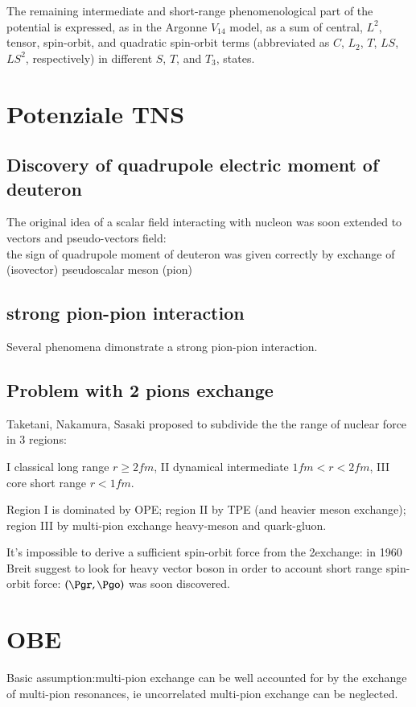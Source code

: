 \documentclass[main.tex]{subfiles}
\begin{document}
The remaining intermediate and short-range phenomenological part of the potential is expressed, as in the Argonne $V_{14}$ model, as a sum of central, $L^2$, tensor, spin-orbit, and quadratic spin-orbit terms (abbreviated as $C$, $L_2$, $T$, $LS$, $LS^2$, respectively) in different $S$, $T$, and $T_3$, states.

\section{Potenziale TNS}

\subsection{Discovery of quadrupole electric moment of deuteron}
The original idea of a scalar field interacting with nucleon was soon extended to vectors and pseudo-vectors field:\\
the sign of quadrupole moment of deuteron was given correctly by exchange of (isovector) pseudoscalar meson (pion)


\subsection{strong pion-pion interaction}
Several phenomena dimonstrate a strong pion-pion interaction.

\subsection{Problem with 2 pions exchange}
Taketani, Nakamura, Sasaki proposed to subdivide the the range of nuclear force in 3 regions:

I classical long range  $r\geq2 fm$, II dynamical intermediate $1 fm< r <2 fm$, III core short range $r < 1 fm$.

Region I is dominated by OPE; region II by TPE (and heavier meson exchange); region III by multi-pion exchange heavy-meson and quark-gluon.

It's impossible to derive a sufficient  spin-orbit force from the 2\Pgp exchange: in 1960 Breit suggest to look for heavy vector boson in order to account short range spin-orbit force: $(\Pgr,\Pgo)$ was soon discovered.

\section{OBE}
Basic assumption:multi-pion exchange can be well accounted for by the exchange of multi-pion resonances, ie uncorrelated multi-pion exchange can be neglected.
\end{document}
